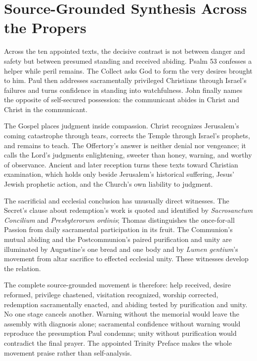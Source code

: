 \sectionguard
\label{triptych:brief-synthesis:next}
\section*{Source-Grounded Synthesis Across the Propers}

Across the ten appointed texts, the decisive contrast is not between danger
and safety but between presumed standing and received abiding. Psalm 53
confesses a helper while peril remains. The Collect asks God to form the very
desires brought to him. Paul then addresses sacramentally privileged
Christians through Israel's failures and turns confidence in standing into
watchfulness. John finally names the opposite of self-secured possession:
the communicant abides in Christ and Christ in the communicant.

The Gospel places judgment inside compassion. Christ recognizes Jerusalem's
coming catastrophe through tears, corrects the Temple through Israel's
prophets, and remains to teach. The Offertory's answer is neither denial nor
vengeance; it calls the Lord's judgments enlightening, sweeter than honey,
warning, and worthy of observance. Ancient and later reception turns these
texts toward Christian examination, which holds only beside Jerusalem's
historical suffering, Jesus' Jewish prophetic action, and the Church's own
liability to judgment.

The sacrificial and ecclesial conclusion has unusually direct witnesses. The
Secret's clause about redemption's work is quoted and identified by
\emph{Sacrosanctum Concilium} and \emph{Presbyterorum ordinis}; Thomas
distinguishes the once-for-all Passion from daily sacramental participation in
its fruit. The Communion's mutual abiding and the Postcommunion's paired
purification and unity are illuminated by Augustine's one bread and one body
and by \emph{Lumen gentium}'s movement from altar sacrifice to effected
ecclesial unity. These witnesses develop the relation.

The complete source-grounded movement is therefore: help received, desire
reformed, privilege chastened, visitation recognized, worship corrected,
redemption sacramentally enacted, and abiding tested by purification and
unity. No one stage cancels another. Warning without the memorial would leave
the assembly with diagnosis alone; sacramental confidence without warning
would reproduce the presumption Paul condemns; unity without purification
would contradict the final prayer. The appointed Trinity Preface makes the
whole movement praise rather than self-analysis.
